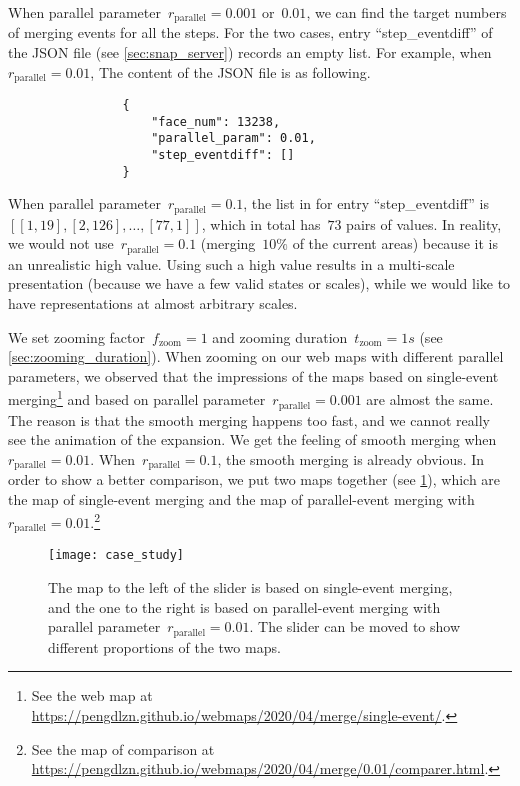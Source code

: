 \documentclass[ijgi,article,submit,moreauthors,pdftex]{Definitions/mdpi}
\begin{document}
When parallel parameter~$r_\mathrm{parallel}= 0.001$ or~$0.01$,
we can find the target numbers of merging events for all the steps.
For the two cases, entry ``step\_eventdiff'' of the JSON file
(see \sect\ref{sec:snap_server})
records an empty list.
For example, when~$r_\mathrm{parallel}= 0.01$,
The content of the JSON file is as following.
\begin{verbatim}
                {
                    "face_num": 13238,
                    "parallel_param": 0.01,                    
                    "step_eventdiff": []
                }
\end{verbatim}
When parallel parameter~$r_\mathrm{parallel}= 0.1$,
the list in for entry ``step\_eventdiff'' is  
$[[1, 19], [2, 126], \dots, [77, 1]]$,
which in total has~$73$ pairs of values.
In reality, we would not use~$r_\mathrm{parallel}= 0.1$
(merging~$10\%$ of the current areas)
because it is an unrealistic high value.
Using such a high value results in a multi-scale presentation
(because we have a few valid states or scales),
while we would like to have representations at almost
arbitrary scales.

We set zooming factor~$f_\mathrm{zoom}=1$ and 
zooming duration~$t_\mathrm{zoom}=1 s$ 
(see \sect\ref{sec:zooming_duration}).
When zooming on our web maps with different parallel parameters,
we observed that the impressions of the maps 
based on single-event merging\footnote{%
See the web map at
\url{https://pengdlzn.github.io/webmaps/2020/04/merge/single-event/}.} 
and based on parallel parameter~$r_\mathrm{parallel}= 0.001$ 
are almost the same.
The reason is that the smooth merging happens too fast,
and we cannot really see the animation of the expansion.
We get the feeling of smooth merging when~$r_\mathrm{parallel}= 0.01$.
When~$r_\mathrm{parallel}= 0.1$, the smooth merging is already obvious.
In order to show a better comparison,
we put two maps together (see \fig\ref{fig:comparison}),
which are the map of single-event merging and 
the map of parallel-event merging with~$r_\mathrm{parallel}= 0.01$.\footnote{%
See the map of comparison at
\url{https://pengdlzn.github.io/webmaps/2020/04/merge/0.01/comparer.html}.}  


\begin{figure}[tb]
\centering
\texttt{[image: case\_study]}
\caption{
    The map to the left of the slider is based on single-event merging,
    and the one to the right is based on parallel-event merging
    with parallel parameter~$r_\mathrm{parallel}= 0.01$.
    The slider can be moved to show different proportions of the two maps.
}
\label{fig:comparison}
\end{figure}
\end{document}
